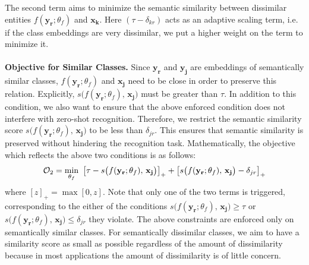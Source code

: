 \documentclass[10pt,twocolumn,letterpaper]{article}
\begin{document}
The second term aims to minimize the semantic similarity between dissimilar entities $f(\mathbf{y_r};\theta_f)$ and $\mathbf{x_k}$. %
Here $(\tau-\delta_{kr})$ acts as an adaptive scaling term, i.e. if the class embeddings are very dissimilar, we put a higher weight on the term to minimize it.\\\\
\textbf{Objective for Similar Classes.} Since $\mathbf{y_r}$ and $\mathbf{y_j}$ are embeddings of semantically similar classes, $f(\mathbf{y_r};\theta_f)$ and $\mathbf{x_j}$ need to be close in order to preserve this relation. 
Explicitly, $s\big(f(\mathbf{y_r}; \theta_f),\,\mathbf{x_j}\big)$ must be greater than $\tau$. In addition to this condition, we also want to ensure that the above enforced condition does not interfere with zero-shot recognition. Therefore, we restrict the semantic similarity score $s\big(f(\mathbf{y_r}; \theta_f),\,\mathbf{x_j}\big)$ to be  less than $\delta_{jr}$. 
This ensures that semantic similarity is preserved without hindering the recognition task. Mathematically, the objective which reflects the above two conditions is as follows:
\begin{equation}
\label{structure}
\mathcal{O}_2 = \min_{\theta_f}\  \small{\big[\tau - s\big(f(\mathbf{y_r}; \theta_f),\,\mathbf{x_j}\big)\big]_+ + \big[s\big(f(\mathbf{y_r};\theta_f),\,\mathbf{x_j}\big) - \delta_{jr}\big]_+}
\end{equation}
where $[z]_+ = \max[0,z]$. Note that only one of the two terms is triggered, corresponding to the either of the conditions $s\big(f(\mathbf{y_r};\theta_f),\,\mathbf{x_j}\big) \geq \tau$ or $s\big(f(\mathbf{y_r};\theta_f),\,\mathbf{x_j}\big) \leq \delta_{jr}$ they violate. 
The above constraints are enforced only on semantically similar classes. 
For semantically dissimilar classes, we aim to have a similarity score as small as possible regardless of the amount of dissimilarity because in most applications the amount of dissimilarity is of little concern.\\\\
\end{document}
